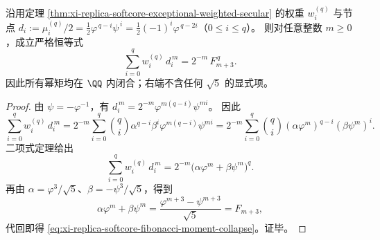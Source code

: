 

\begin{theorem}\label{thm:xi-replica-softcore-fibonacci-moment-collapse}
沿用定理 \ref{thm:xi-replica-softcore-exceptional-weighted-secular} 的权重 \(w_i^{(q)}\) 与节点
\(
d_i:=\mu_i^{(q)}/2=\frac12\varphi^{\,q-i}\psi^{\,i}=\frac12(-1)^i\varphi^{\,q-2i}
\)（\(0\le i\le q\)）。
则对任意整数 \(m\ge 0\)，成立严格恒等式
\begin{equation}\label{eq:xi-replica-softcore-fibonacci-moment-collapse}
\sum_{i=0}^{q} w_i^{(q)}\,d_i^{\,m}
=2^{-m}\,F_{m+3}^{\,q}.
\end{equation}
因此所有幂矩均在 \(\QQ\) 内闭合；右端不含任何 \(\sqrt5\) 的显式项。
\end{theorem}
\begin{proof}
由 \(\psi=-\varphi^{-1}\)，有
\(
d_i^{\,m}=2^{-m}\varphi^{m(q-i)}\psi^{mi}
\)。
因此
\[
\sum_{i=0}^{q} w_i^{(q)}\,d_i^{\,m}
=2^{-m}\sum_{i=0}^{q}\binom{q}{i}\alpha^{q-i}\beta^{i}\varphi^{m(q-i)}\psi^{mi}
=2^{-m}\sum_{i=0}^{q}\binom{q}{i}(\alpha\varphi^m)^{q-i}(\beta\psi^m)^{i}.
\]
二项式定理给出
\[
\sum_{i=0}^{q} w_i^{(q)}\,d_i^{\,m}
=2^{-m}\bigl(\alpha\varphi^m+\beta\psi^m\bigr)^{q}.
\]
再由
\(
\alpha=\varphi^3/\sqrt5
\)、\(
\beta=-\psi^3/\sqrt5
\)，得到
\[
\alpha\varphi^m+\beta\psi^m=\frac{\varphi^{m+3}-\psi^{m+3}}{\sqrt5}=F_{m+3},
\]
代回即得 \eqref{eq:xi-replica-softcore-fibonacci-moment-collapse}。证毕。
\end{proof}



